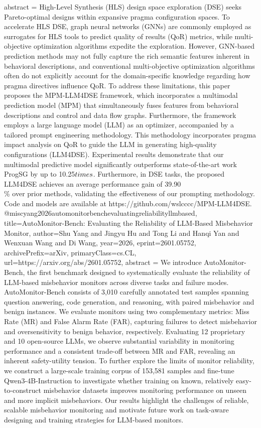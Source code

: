 {      abstract = {High-Level Synthesis (HLS) design space exploration (DSE) seeks Pareto-optimal designs within expansive pragma configuration spaces. To accelerate HLS DSE, graph neural networks (GNNs) are commonly employed as surrogates for HLS tools to predict quality of results (QoR) metrics, while multi-objective optimization algorithms expedite the exploration. However, GNN-based prediction methods may not fully capture the rich semantic features inherent in behavioral descriptions, and conventional multi-objective optimization algorithms often do not explicitly account for the domain-specific knowledge regarding how pragma directives influence QoR. To address these limitations, this paper proposes the MPM-LLM4DSE framework, which incorporates a multimodal prediction model (MPM) that simultaneously fuses features from behavioral descriptions and control and data flow graphs. Furthermore, the framework employs a large language model (LLM) as an optimizer, accompanied by a tailored prompt engineering methodology. This methodology incorporates pragma impact analysis on QoR to guide the LLM in generating high-quality configurations (LLM4DSE). Experimental results demonstrate that our multimodal predictive model significantly outperforms state-of-the-art work ProgSG by up to 10.25$\\times$. Furthermore, in DSE tasks, the proposed LLM4DSE achieves an average performance gain of 39.90\\\% over prior methods, validating the effectiveness of our prompting methodology. Code and models are available at https://github.com/wslcccc/MPM-LLM4DSE.}
}@misc{yang2026automonitorbenchevaluatingreliabilityllmbased,
      title={AutoMonitor-Bench: Evaluating the Reliability of LLM-Based Misbehavior Monitor}, 
      author={Shu Yang and Jingyu Hu and Tong Li and Hanqi Yan and Wenxuan Wang and Di Wang},
      year={2026},
      eprint={2601.05752},
      archivePrefix={arXiv},
      primaryClass={cs.CL},
      url={https://arxiv.org/abs/2601.05752},
      abstract = {We introduce AutoMonitor-Bench, the first benchmark designed to systematically evaluate the reliability of LLM-based misbehavior monitors across diverse tasks and failure modes. AutoMonitor-Bench consists of 3,010 carefully annotated test samples spanning question answering, code generation, and reasoning, with paired misbehavior and benign instances. We evaluate monitors using two complementary metrics: Miss Rate (MR) and False Alarm Rate (FAR), capturing failures to detect misbehavior and oversensitivity to benign behavior, respectively. Evaluating 12 proprietary and 10 open-source LLMs, we observe substantial variability in monitoring performance and a consistent trade-off between MR and FAR, revealing an inherent safety-utility tension. To further explore the limits of monitor reliability, we construct a large-scale training corpus of 153,581 samples and fine-tune Qwen3-4B-Instruction to investigate whether training on known, relatively easy-to-construct misbehavior datasets improves monitoring performance on unseen and more implicit misbehaviors. Our results highlight the challenges of reliable, scalable misbehavior monitoring and motivate future work on task-aware designing and training strategies for LLM-based monitors.}
}
